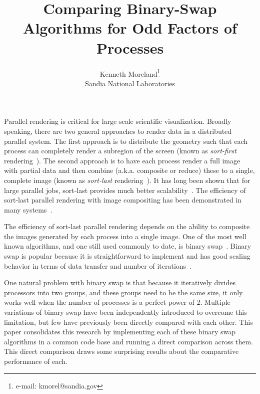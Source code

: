 \documentclass{vgtc}                          %
\title{Comparing Binary-Swap Algorithms for Odd Factors of Processes}
\author{\redact{Anonymous}}
\author{
    Kenneth Moreland\thanks{e-mail: kmorel@sandia.gov}\\
    \scriptsize Sandia National Laboratories
  }
\newcommand*{\lcite}[1]{~\cite{#1}}
\newcommand*{\keyterm}[1]{\emph{#1}}
\newcommand*{\textalgorithm}[1]{\textsf{#1}\xspace}
\newcommand{\binaryswap}{\textalgorithm{binary swap}}
\newcommand{\Binaryswap}{\textalgorithm{Binary swap}}
\begin{document}


\maketitle

Parallel rendering is critical for large-scale scientific visualization.
Broadly speaking, there are two general approaches to render data in a distributed parallel system.
The first approach is to distribute the geometry such that each process can completely render a subregion of the screen (known as \keyterm{sort-first} rendering\lcite{Molnar1994}).
The second approach is to have each process render a full image with partial data and then combine (a.k.a. composite or reduce) these to a single, complete image (known as \keyterm{sort-last} rendering\lcite{Molnar1994}).
It has long been shown that for large parallel jobs, sort-last provides much better scalability\lcite{Mueller1995,Wylie2001}.
The efficiency of sort-last parallel rendering with image compositing has been demonstrated in many systems\lcite{Childs2010,Moreland2011:SC,Peterka2009:ICPP,Peterka2013}.

The efficiency of sort-last parallel rendering depends on the ability to composite the images generated by each process into a single image.
One of the most well known algorithms, and one still used commonly to date, is \binaryswap\lcite{BinarySwap1}.
\Binaryswap is popular because it is straightforward to implement and has good scaling behavior in terms of data transfer and number of iterations\lcite{Peterka2013}.

One natural problem with \binaryswap is that because it iteratively divides processors into two groups, and these groups need to be the same size, it only works well when the number of processes is a perfect power of 2.
Multiple variations of \binaryswap have been independently introduced to overcome this limitation, but few have previously been directly compared with each other.
This paper consolidates this research by implementing each of these \binaryswap algorithms in a common code base and running a direct comparison across them.
This direct comparison draws some surprising results about the comparative performance of each.
\end{document}
